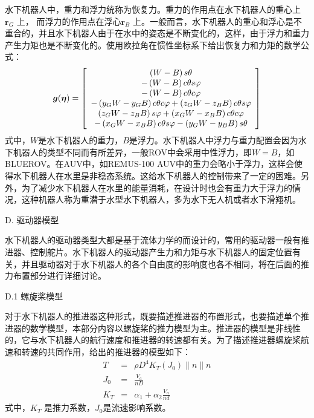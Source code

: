 水下机器人中，重力和浮力统称为恢复力。重力的作用点在水下机器人的重心上$\bm{r}_G$ 上， 而浮力的作用点在浮心$\bm{r}_B$ 上。一般而言，水下机器人的重心和浮心是不重合的，并且水下机器人由于在水中的姿态是不断变化的，这样，由于浮力和重力产生力矩也是不断变化的。使用欧拉角在惯性坐标系下给出恢复力和力矩的数学公式：
\begin{equation}
\centering
\label{eq:chap2:27}
\bm{g}(\bm {\eta} ) = \left[ {\begin{array}{*{20}{c}}
   {\left( {W - B} \right)s\theta }  \\
   { - \left( {W - B} \right)c\theta s\varphi }  \\
   { - \left( {W - B} \right)c\theta c\varphi }  \\
   { - \left( {{y_G}W - {y_G}B} \right)c\theta c\varphi  + \left( {{z_G}W - {z_B}B} \right)c\theta s\varphi }  \\
   {\left( {{z_G}W - {z_B}B} \right)s\varphi  + \left( {{x_G}W - {x_B}B} \right)c\theta c\varphi }  \\
   { - \left( {{x_G}W - {x_B}B} \right)c\theta s\varphi  - \left( {{y_G}W - {y_B}B} \right)s\theta }  \\
\end{array}} \right]
\end{equation}
式中，$W$是水下机器人的重力，$B$是浮力。水下机器人中浮力与重力配置会因为水下机器人的类型不同而有所差异，一般ROV中会采用中性浮力，即$W=B$，如BLUEROV。在AUV中，如REMUS-100 AUV中的重力会略小于浮力，这样会使得水下机器人在水里是非稳态系统。这给水下机器人的控制带来了一定的困难。另外，为了减少水下机器人在水里的能量消耗，在设计时也会有重力大于浮力的情况，这种机器人称为重潜于水型水下机器人，多为水下无人机或者水下滑翔机。

D. 驱动器模型

水下机器人的驱动器类型大都是基于流体力学的而设计的，常用的驱动器一般有推进器、控制舵片。水下机器人的驱动器产生力和力矩与水下机器人的固定位置有关，并且驱动器对于水下机器人的各个自由度的影响度也各不相同，将在后面的推力布置部分进行详细讨论。

D.1 螺旋桨模型

对于水下机器人的推进器这种形式，既要描述推进器的布置形式，也要描述单个推进器的数学模型，本部分内容以螺旋桨的推力模型为主。推进器的模型是非线性的，它与水下机器人的航行速度和推进器的转速都有关。为了描述推进器螺旋桨航速和转速的共同作用，给出的推进器的模型如下：
\begin{eqnarray}
\label{eq:chap2:28}
T&=& \rho D^4 K_T (J_0)\|n\| n \\
J_0 &=& \frac{V_a}{nD}\\
K_T&=&\alpha_1 + \alpha_2 \frac{V_a}{nd}
\end{eqnarray}
式中，$K_T$ 是推力系数，$J_0$是流速影响系数。

